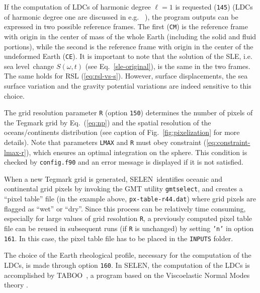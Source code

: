 \documentclass[11pt,fleqn,a4paper,titlepage]{article}
\newcommand\selen{\textsf{SELEN~}}
\newcommand\selens{\textsf{SELEN}}
\newcommand\sealevel{sea level~}
\begin{document}
If the computation of LDCs of harmonic degree $\ell=1$ is requested (\texttt{145}) (LDCs of harmonic degree one are discussed in 
e.g. \citeauthor{Spada_etal_2011}~\citeyear{Spada_etal_2011}), the program outputs can be 
expressed in two
possible reference frames. The first (\texttt{CM}) is the reference frame with origin in the center of mass of the
whole Earth (including the solid and fluid portions), while the second is the reference frame with origin in the 
center of the undeformed Earth (\texttt{CE}). It is important to note that the solution of the SLE, i.e. \sealevel change $S(\omega,t)$
(see Eq.~\ref{sle-original}), is the same in the two frames. The same holds for RSL (\ref{eq:rsl-vs-s}). However, surface 
displacements, the sea surface variation and the gravity potential variations are indeed sensitive to this choice. 

The grid resolution parameter \texttt{R} (option \texttt{150}) determines the number of pixels of the Tegmark grid 
by Eq.~(\ref{eq:np}) and the spatial resolution of the oceans/continents distribution (see caption of Fig.~\ref{fig:pixelization} for more details). Note that parameters \texttt{LMAX} and \texttt{R} must obey constraint (\ref{eq:constraint-lmax-r}), which ensures an optimal integration on the sphere. This condition is checked by \texttt{config.f90} and an error message is displayed if it is not satisfied. 

When a new Tegmark grid is generated, \selen identifies oceanic and continental grid pixels by invoking the GMT utility \texttt{gmtselect}, and creates a ``pixel table'' file (in the example above, \texttt{px-table-r44.dat}) where grid pixels are flagged as ``wet'' or ``dry''.  Since this process can be relatively time consuming, especially for large values of grid resolution \texttt{R}, a previously computed pixel table file can be reused in subsequent runs (if \texttt{R} is unchanged) by setting \texttt{'n'} in option \texttt{161}. In this case, the pixel table file has to be placed in the \texttt{INPUTS} folder.

\vspace{0.4cm}

{\color{Cyan}{\scriptsize\begin{verbatim}
    ...
    ====> RHEOLOGICAL MODEL -------------------------------------------------------
    160    Rheological profile info:                         '2' '2' 'vsc_BJ97.dat'  
    ...
\end{verbatim} }}
\noindent The choice of the Earth rheological profile, necessary for the computation of 
the LDCs, is made through option \texttt{160}. In \selens, the computation of the 
LDCs is accomplished by TABOO~\citep{Spada-2003a,tabooeos}, a program 
based on the Viscoelastic Normal Modes theory \citep{Peltier_1974}. 
\end{document}
